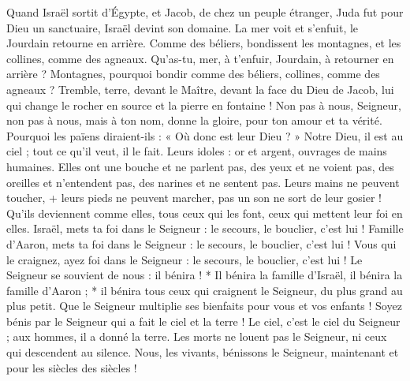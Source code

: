 Quand Israël sortit d'Égypte, et Jacob, de chez un peuple étranger,
\versseparator
Juda fut pour Dieu un sanctuaire, Israël devint son domaine.
\versseparator
La mer voit et s'enfuit, le Jourdain retourne en arrière.
\versseparator
Comme des béliers, bondissent les montagnes, et les collines, comme des agneaux.
\versseparator
Qu'as-tu, mer, à t'enfuir, Jourdain, à retourner en arrière ?
\versseparator
Montagnes, pourquoi bondir comme des béliers, collines, comme des agneaux ?
\versseparator
Tremble, terre, devant le Maître, devant la face du Dieu de Jacob,
\versseparator
lui qui change le rocher en source et la pierre en fontaine !
\versseparator
Non pas à nous, Seigneur, non pas à nous, mais à ton nom, donne la gloire, pour ton amour et ta vérité.
\versseparator
Pourquoi les païens diraient-ils : « Où donc est leur Dieu ? »
\versseparator
Notre Dieu, il est au ciel ; tout ce qu'il veut, il le fait.
\versseparator
Leurs idoles : or et argent, ouvrages de mains humaines.
\versseparator
Elles ont une bouche et ne parlent pas, des yeux et ne voient pas,
\versseparator
des oreilles et n'entendent pas, des narines et ne sentent pas.
\versseparator
Leurs mains ne peuvent toucher, + leurs pieds ne peuvent marcher, pas un son ne sort de leur gosier !
\versseparator
Qu'ils deviennent comme elles, tous ceux qui les font, ceux qui mettent leur foi en elles.
\versseparator
Israël, mets ta foi dans le Seigneur : le secours, le bouclier, c'est lui !
\versseparator
Famille d'Aaron, mets ta foi dans le Seigneur : le secours, le bouclier, c'est lui !
\versseparator
Vous qui le craignez, ayez foi dans le Seigneur : le secours, le bouclier, c'est lui !
\versseparator
Le Seigneur se souvient de nous : il bénira ! * Il bénira la famille d'Israël, il bénira la famille d'Aaron ; *
\versseparator
il bénira tous ceux qui craignent le Seigneur, du plus grand au plus petit.
\versseparator
Que le Seigneur multiplie ses bienfaits pour vous et vos enfants !
\versseparator
Soyez bénis par le Seigneur qui a fait le ciel et la terre !
\versseparator
Le ciel, c'est le ciel du Seigneur ; aux hommes, il a donné la terre.
\versseparator
Les morts ne louent pas le Seigneur, ni ceux qui descendent au silence.
\versseparator
Nous, les vivants, bénissons le Seigneur, maintenant et pour les siècles des siècles !
